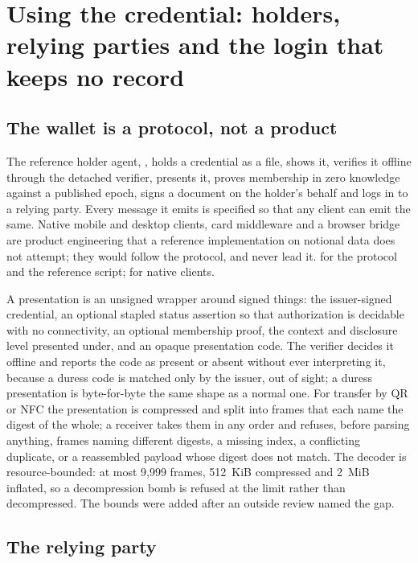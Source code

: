 \section{Using the credential: holders, relying parties and the login that keeps no record}
\label{sec:use}

\subsection{The wallet is a protocol, not a product}

The reference holder agent, , holds a credential as a file, shows
it, verifies it offline through the detached verifier, presents it, proves membership in zero
knowledge against a published epoch, signs a document on the holder's behalf and logs in to a
relying party. Every message it emits is specified so that any client can emit the same. Native
mobile and desktop clients, card middleware and a browser bridge are product engineering that a
reference implementation on notional data does not attempt; they would follow the protocol, and
never lead it. \sImpl{} for the protocol and the reference script; \sFut{} for native clients.

A presentation is an unsigned wrapper around signed things: the issuer-signed credential, an
optional stapled status assertion so that authorization is decidable with no connectivity, an
optional membership proof, the context and disclosure level presented under, and an opaque
presentation code. The verifier decides it offline and reports the code as present or absent
without ever interpreting it, because a duress code is matched only by the issuer, out of sight; a
duress presentation is byte-for-byte the same shape as a normal one. For transfer by QR or NFC the
presentation is compressed and split into frames that each name the digest of the whole; a receiver
takes them in any order and refuses, before parsing anything, frames naming different digests, a
missing index, a conflicting duplicate, or a reassembled payload whose digest does not match. The
decoder is resource-bounded: at most 9,999 frames, 512~KiB compressed and 2~MiB inflated, so a
decompression bomb is refused at the limit rather than decompressed. The bounds were added after an
outside review named the gap. \sImpl

\subsection{The relying party}

